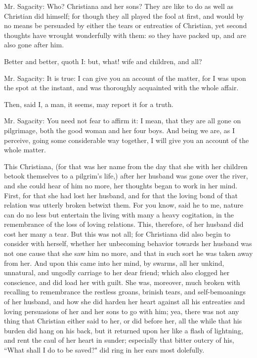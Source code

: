 Mr. Sagacity: Who? Christiana and her sons? They are like to do as well as Christian did himself; for though they all played the fool at first, and would by no means be persuaded by either the tears or entreaties of Christian, yet second thoughts have wrought wonderfully with them: so they have packed up, and are also gone after him.

Better and better, quoth I: but, what! wife and children, and all?

Mr. Sagacity: It is true: I can give you an account of the matter, for I was upon the spot at the instant, and was thoroughly acquainted with the whole affair.

Then, said I, a man, it seems, may report it for a truth.

Mr. Sagacity: You need not fear to affirm it: I mean, that they are all gone on pilgrimage, both the good woman and her four boys. And being we are, as I perceive, going some considerable way together, I will give you an account of the whole matter.

This Christiana, (for that was her name from the day that she with her children betook themselves to a pilgrim's life,) after her husband was gone over the river, and she could hear of him no more, her thoughts began to work in her mind. First, for that she had lost her husband, and for that the loving bond of that relation was utterly broken betwixt them. For you know, said he to me, nature can do no less but entertain the living with many a heavy cogitation, in the remembrance of the loss of loving relations. This, therefore, of her husband did cost her many a tear. But this was not all; for Christiana did also begin to consider with herself, whether her unbecoming behavior towards her husband was not one cause that she saw him no more, and that in such sort he was taken away from her. And upon this came into her mind, by swarms, all her unkind, unnatural, and ungodly carriage to her dear friend; which also clogged her conscience, and did load her with guilt. She was, moreover, much broken with recalling to remembrance the restless groans, brinish tears, and self-bemoanings of her husband, and how she did harden her heart against all his entreaties and loving persuasions of her and her sons to go with him; yea, there was not any thing that Christian either said to her, or did before her, all the while that his burden did hang on his back, but it returned upon her like a flash of lightning, and rent the caul of her heart in sunder; especially that bitter outcry of his, ``What shall I do to be saved?" did ring in her ears most dolefully.


